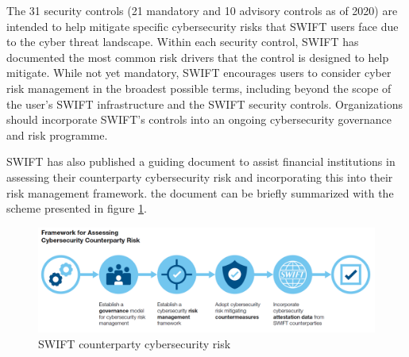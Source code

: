 \documentclass[12pt]{article}
\begin{document}
        The 31 security controls (21 mandatory and 10 advisory controls as of 2020) are intended to help mitigate specific cybersecurity risks that SWIFT users face due to the cyber threat landscape. Within each security control, SWIFT has documented the most common risk drivers that the control is designed to help mitigate. While not yet mandatory, SWIFT encourages users to consider cyber risk management in the broadest possible terms, including beyond the scope of the user's SWIFT infrastructure and the SWIFT security controls. Organizations should incorporate SWIFT's controls into an ongoing cybersecurity governance and risk programme.
        
        SWIFT has also published a guiding document to assist financial institutions in assessing their counterparty cybersecurity risk and incorporating this into their risk management framework. the document can be briefly summarized with the scheme presented in figure \ref{fig:frisk}.
        
        \begin{figure}[H]
        \centering
        \includegraphics[width=\textwidth,cfbox=red 0.1mm 0.1mm]{figures/frisk.png}
        \caption{SWIFT counterparty cybersecurity risk}
        \label{fig:frisk}
        \end{figure}
        
\end{document}
